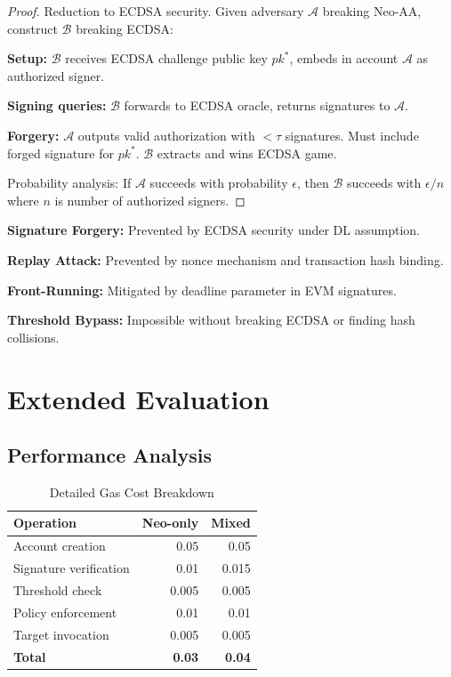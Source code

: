 \documentclass[10pt,twocolumn]{article}
\begin{document}
\begin{proof}
Reduction to ECDSA security. Given adversary $\mathcal{A}$ breaking Neo-AA, construct $\mathcal{B}$ breaking ECDSA:

\textbf{Setup:} $\mathcal{B}$ receives ECDSA challenge public key $pk^*$, embeds in account $\mathcal{A}$ as authorized signer.

\textbf{Signing queries:} $\mathcal{B}$ forwards to ECDSA oracle, returns signatures to $\mathcal{A}$.

\textbf{Forgery:} $\mathcal{A}$ outputs valid authorization with $< \tau$ signatures. Must include forged signature for $pk^*$. $\mathcal{B}$ extracts and wins ECDSA game.

Probability analysis: If $\mathcal{A}$ succeeds with probability $\epsilon$, then $\mathcal{B}$ succeeds with $\epsilon/n$ where $n$ is number of authorized signers.
\end{proof}


\textbf{Signature Forgery:} Prevented by ECDSA security under DL assumption.

\textbf{Replay Attack:} Prevented by nonce mechanism and transaction hash binding.

\textbf{Front-Running:} Mitigated by deadline parameter in EVM signatures.

\textbf{Threshold Bypass:} Impossible without breaking ECDSA or finding hash collisions.


\section{Extended Evaluation}

\subsection{Performance Analysis}

\begin{table}[h]
\centering
\caption{Detailed Gas Cost Breakdown}
\begin{tabular}{@{}lrr@{}}
\toprule
Operation & Neo-only & Mixed \\\midrule
Account creation & 0.05 & 0.05 \\
Signature verification & 0.01 & 0.015 \\
Threshold check & 0.005 & 0.005 \\
Policy enforcement & 0.01 & 0.01 \\
Target invocation & 0.005 & 0.005 \\
\textbf{Total} & \textbf{0.03} & \textbf{0.04} \\
\bottomrule
\end{tabular}
\end{table}
\end{document}
